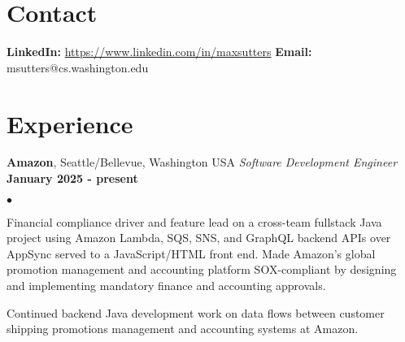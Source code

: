 \documentclass[margin,line]{res}
\newenvironment{list2}{
  \begin{list}{$\bullet$}{%
      \setlength{\itemsep}{0in}
      \setlength{\parsep}{0in} \setlength{\parskip}{0in}
      \setlength{\topsep}{0in} \setlength{\partopsep}{0in} 
      \setlength{\leftmargin}{0.2in}} \raggedright}{\end{list}}
\begin{document}
\thispagestyle{empty}


\begin{resume}
\section{\sc Contact} %
{\bf LinkedIn:} \url{https://www.linkedin.com/in/maxsutters}
{\bf Email:}  msutters@cs.washington.edu 

\section{\sc Experience}

{\bf Amazon}, Seattle/Bellevue, Washington USA \newline
{\em Software Development Engineer} \hfill {\bf January 2025 - present} \newline

\begin{list2}
\item Financial compliance driver and feature lead on a cross-team fullstack Java project using Amazon Lambda, SQS, SNS, and GraphQL backend APIs over AppSync served to a JavaScript/HTML front end. Made Amazon's global promotion management and accounting platform SOX-compliant by designing and implementing mandatory finance and accounting approvals.
\item Continued backend Java development work on data flows between customer shipping promotions management and accounting systems at Amazon.
\end{list2}


\end{resume}
\end{document}
